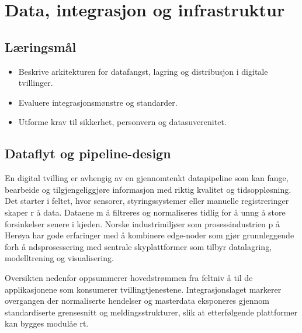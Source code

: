\chapter{Data, integrasjon og infrastruktur}

\section{Læringsmål}
\begin{itemize}
    \item Beskrive arkitekturen for datafangst, lagring og distribusjon i digitale tvillinger.
    \item Evaluere integrasjonsmønstre og standarder.
    \item Utforme krav til sikkerhet, personvern og datasuverenitet.
\end{itemize}

\section{Dataflyt og pipeline-design}
En digital tvilling er avhengig av en gjennomtenkt datapipeline som kan fange, bearbeide og tilgjengeliggjøre informasjon med riktig kvalitet og tidsoppløsning. Det starter i feltet, hvor sensorer, styringssystemer eller manuelle registreringer skaper r å data. Dataene m å filtreres og normaliseres tidlig for  å unng å store forsinkelser senere i kjeden. Norske industrimiljøer som prosessindustrien p å Herøya har gode erfaringer med  å kombinere edge-noder som gjør grunnleggende forh å ndsprosessering med sentrale skyplattformer som tilbyr datalagring, modelltrening og visualisering.

Oversikten nedenfor oppsummerer hovedstrømmen fra feltniv å til de applikasjonene som konsumerer tvillingtjenestene. Integrasjonslaget markerer overgangen der normaliserte hendelser og masterdata eksponeres gjennom standardiserte grensesnitt og meldingsstrukturer, slik at etterfølgende plattformer kan bygges modulåe rt.

